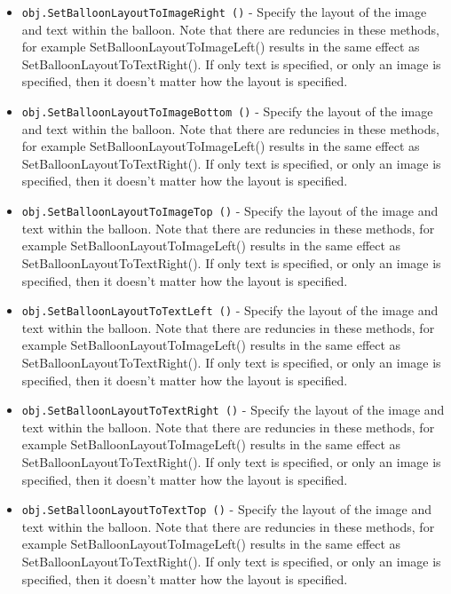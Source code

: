 \begin{itemize}
\item  \verb|obj.SetBalloonLayoutToImageRight ()| -  Specify the layout of the image and text within the balloon. Note that
 there are reduncies in these methods, for example
 SetBalloonLayoutToImageLeft() results in the same effect as
 SetBalloonLayoutToTextRight(). If only text is specified, or only an
 image is specified, then it doesn't matter how the layout is specified.

\item  \verb|obj.SetBalloonLayoutToImageBottom ()| -  Specify the layout of the image and text within the balloon. Note that
 there are reduncies in these methods, for example
 SetBalloonLayoutToImageLeft() results in the same effect as
 SetBalloonLayoutToTextRight(). If only text is specified, or only an
 image is specified, then it doesn't matter how the layout is specified.

\item  \verb|obj.SetBalloonLayoutToImageTop ()| -  Specify the layout of the image and text within the balloon. Note that
 there are reduncies in these methods, for example
 SetBalloonLayoutToImageLeft() results in the same effect as
 SetBalloonLayoutToTextRight(). If only text is specified, or only an
 image is specified, then it doesn't matter how the layout is specified.

\item  \verb|obj.SetBalloonLayoutToTextLeft ()| -  Specify the layout of the image and text within the balloon. Note that
 there are reduncies in these methods, for example
 SetBalloonLayoutToImageLeft() results in the same effect as
 SetBalloonLayoutToTextRight(). If only text is specified, or only an
 image is specified, then it doesn't matter how the layout is specified.

\item  \verb|obj.SetBalloonLayoutToTextRight ()| -  Specify the layout of the image and text within the balloon. Note that
 there are reduncies in these methods, for example
 SetBalloonLayoutToImageLeft() results in the same effect as
 SetBalloonLayoutToTextRight(). If only text is specified, or only an
 image is specified, then it doesn't matter how the layout is specified.

\item  \verb|obj.SetBalloonLayoutToTextTop ()| -  Specify the layout of the image and text within the balloon. Note that
 there are reduncies in these methods, for example
 SetBalloonLayoutToImageLeft() results in the same effect as
 SetBalloonLayoutToTextRight(). If only text is specified, or only an
 image is specified, then it doesn't matter how the layout is specified.


\end{itemize}
